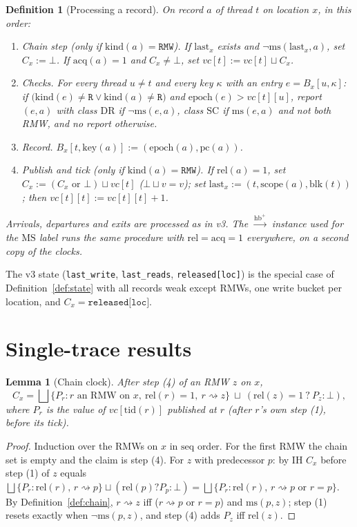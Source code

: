 \documentclass[11pt]{article}
\newtheorem{definition}{Definition}
\newtheorem{lemma}{Lemma}
\theoremstyle{remark}
\newcommand{\HBu}{\xrightarrow{\mathrm{hb}^{+}}}
\newcommand{\tid}{\mathrm{tid}}
\newcommand{\kind}{\mathrm{kind}}
\newcommand{\scope}{\mathrm{scope}}
\newcommand{\blk}{\mathrm{blk}}
\newcommand{\rel}{\mathrm{rel}}
\newcommand{\acq}{\mathrm{acq}}
\newcommand{\ms}{\mathrm{ms}}
\newcommand{\DR}{\mathrm{DR}}
\newcommand{\SC}{\mathrm{SC}}
\newcommand{\MS}{\mathrm{MS}}
\newcommand{\seq}{\mathrm{seq}}
\newcommand{\epoch}{\mathrm{epoch}}
\newcommand{\vc}{\mathit{vc}}
\newcommand{\chain}{\rightsquigarrow}
\newcommand{\Chain}{C}
\newcommand{\Pub}{P}
\newcommand{\bucket}{\mathrm{key}}
\begin{document}
\begin{definition}[Processing a record]\label{def:alg}
On record $a$ of thread $t$ on location $x$, in this order:
\begin{enumerate}[nosep]
\item[(1)] \emph{Chain step} (only if $\kind(a)=\mathtt{RMW}$). If
      $\mathrm{last}_x$ exists and $\neg\ms(\mathrm{last}_x,a)$, set
      $\Chain_x:=\bot$. If $\acq(a)=1$ and $\Chain_x\ne\bot$, set
      $\vc[t]:=\vc[t]\sqcup\Chain_x$.
\item[(2)] \emph{Checks.} For every thread $u\ne t$ and every key $\kappa$
      with an entry $e=B_x[u,\kappa]$: if
      $\big(\kind(e)\ne\mathtt{R}\vee\kind(a)\ne\mathtt{R}\big)$ and
      $\epoch(e)>\vc[t][u]$, report $(e,a)$ with class $\DR$ if
      $\neg\ms(e,a)$, class $\SC$ if $\ms(e,a)$ and not both RMW, and no
      report otherwise.
\item[(3)] \emph{Record.} $B_x[t,\bucket(a)]:=(\epoch(a),\mathrm{pc}(a))$.
\item[(4)] \emph{Publish and tick} (only if $\kind(a)=\mathtt{RMW}$). If
      $\rel(a)=1$, set $\Chain_x:=(\Chain_x\text{ or }\bot)\sqcup\vc[t]$
      ($\bot\sqcup v=v$); set $\mathrm{last}_x:=(t,\scope(a),\blk(t))$; then
      $\vc[t][t]:=\vc[t][t]+1$.
\end{enumerate}
Arrivals, departures and exits are processed as in v3. The $\HBu$ instance
used for the $\MS$ label runs the same procedure with $\rel=\acq=1$
everywhere, on a second copy of the clocks.
\end{definition}

The v3 state (\texttt{last\_write}, \texttt{last\_reads},
\texttt{released[loc]}) is the special case of Definition~\ref{def:state} with
all records weak except RMWs, one write bucket per location, and
$\Chain_x=\texttt{released[loc]}$.

\section{Single-trace results}

\begin{lemma}[Chain clock]\label{lem:chain}
After step (4) of an RMW $z$ on $x$,
\[
\Chain_x=\bigsqcup\{\Pub_r : r\text{ an RMW on }x,\ \rel(r)=1,\ r\chain z\}
\ \sqcup\ (\rel(z)=1\ ?\ \Pub_z : \bot),
\]
where $\Pub_r$ is the value of $\vc[\tid(r)]$ published at $r$ (after $r$'s
own step (1), before its tick).
\end{lemma}
\begin{proof}
Induction over the RMWs on $x$ in $\seq$ order. For the first RMW the chain
set is empty and the claim is step (4). For $z$ with predecessor $p$: by IH
$\Chain_x$ before step (1) of $z$ equals
$\bigsqcup\{\Pub_r:\rel(r),\,r\chain p\}\sqcup(\rel(p)?\Pub_p:\bot)
=\bigsqcup\{\Pub_r:\rel(r),\,r\chain p\text{ or }r=p\}$. By
Definition~\ref{def:chain}, $r\chain z$ iff ($r\chain p$ or $r=p$) and
$\ms(p,z)$; step (1) resets exactly when $\neg\ms(p,z)$, and step (4) adds
$\Pub_z$ iff $\rel(z)$.
\end{proof}
\end{document}

